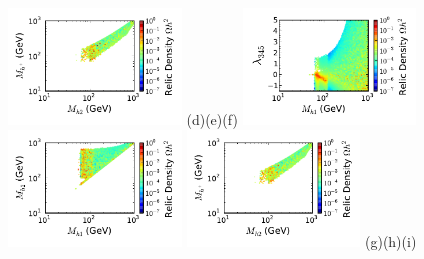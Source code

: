 \documentclass[12pt,a4paper]{article}
\begin{document}
\begin{figure}[htb]
{\hspace*{-1.77cm}\includegraphics[width=0.41\textwidth]{Mhc_Mh2_Omega_large-cut123456.pdf}}%
\vskip -1.1cm
\hspace*{1.2cm}(d)\hspace*{0.35\textwidth}\hspace*{-1.3cm}(e)\hspace*{0.35\textwidth}\hspace*{-1.2cm}(f)
\vskip 0.0cm
{\hspace*{-0.3cm}\includegraphics[width=0.41\textwidth]{Mh1_ld345_Omega_large-cut1234567.pdf}}%
{\hspace*{-1.78cm}\includegraphics[width=0.41\textwidth]{Mh1_Mh2_Omega_large-cut1234567.pdf}}%
{\hspace*{-1.77cm}\includegraphics[width=0.41\textwidth]{Mhc_Mh2_Omega_large-cut1234567.pdf}}%
\vskip -1.05cm
\hspace*{1.2cm}(g)\hspace*{0.35\textwidth}\hspace*{-1.3cm}(h)\hspace*{0.35\textwidth}\hspace*{-1.2cm}(i)

\end{figure}
\end{document}
